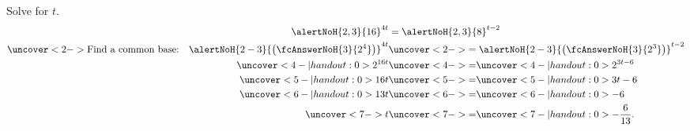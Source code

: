 \begin{frame}
\begin{example}
Solve for $t$.
\begin{align*}
\alertNoH{2,3}{16}^{4t} & = \alertNoH{2,3}{8}^{t-2} \\
\uncover<2->{\text{Find a common base:}\quad \alertNoH{ 2-3}{\big( \fcAnswerNoH{3}{2^4}\big)}^{4t}} & \uncover<2->{ = \alertNoH{ 2-3}{\big( \fcAnswerNoH{3}{2^3}\big)}^{t-2} } \\
\uncover<4-| handout:0>{2^{16t}} & \uncover<4->{=} \uncover<4-| handout:0>{ 2^{3t-6}} \\
\uncover<5-| handout:0>{16t} & \uncover<5->{=} \uncover<5-| handout:0>{ 3t - 6} \\
\uncover<6-| handout:0>{13t} & \uncover<6->{=} \uncover<6-| handout:0>{  -6} \\
\uncover<7->{t} & \uncover<7->{=} \uncover<7-| handout:0>{  -\frac{6}{13}.}
\end{align*}
\end{example}
\end{frame}
